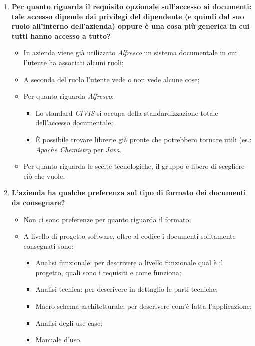 \documentclass[11pt]{article}
\begin{document}
\begin{enumerate}
			
			
			\bigskip 
			
			\item \textbf{Per quanto riguarda il requisito opzionale sull'accesso ai documenti: tale accesso dipende dai
			privilegi del dipendente (e quindi dal suo ruolo all'interno dell'azienda) oppure è una cosa più generica in cui tutti
			hanno accesso a tutto?}
			
			\medskip
			
			\begin{itemize}
				\item In azienda viene già utilizzato \textit{Alfresco} un sistema documentale in cui l'utente ha associati
				alcuni ruoli;
				\item A seconda del ruolo l'utente vede o non vede alcune cose;
				\item Per quanto riguarda \textit{Alfresco}:
				\begin{itemize}
					\item Lo standard \textit{CIVIS} si occupa della standardizzazione totale dell'accesso documentale;
					\item È possibile trovare librerie già pronte che potrebbero tornare utili (es.: \textit{Apache Chemistry}
					per \textit{Java}.
				\end{itemize}
				\item Per quanto riguarda le scelte tecnologiche, il gruppo è libero di scegliere ciò che vuole.
			\end{itemize}
			
			\bigskip 
			
			\item \textbf{L'azienda ha qualche preferenza sul tipo di formato dei documenti da consegnare?}
			
			\medskip
			
			\begin{itemize}
				\item Non ci sono preferenze per quanto riguarda il formato;
				\item A livello di progetto software, oltre al codice i documenti solitamente consegnati sono:
				\begin{itemize}
					\item Analisi funzionale: per descrivere a livello funzionale qual è il progetto, quali sono i requisiti e come funziona;
					\item Analisi tecnica: per descrivere in dettaglio le parti tecniche;
					\item Macro schema architetturale: per descrivere com'è fatta l'applicazione;
					\item Analisi degli use case;
					\item Manuale d'uso.
				\end{itemize}
			\end{itemize}


\end{enumerate}
\end{document}
